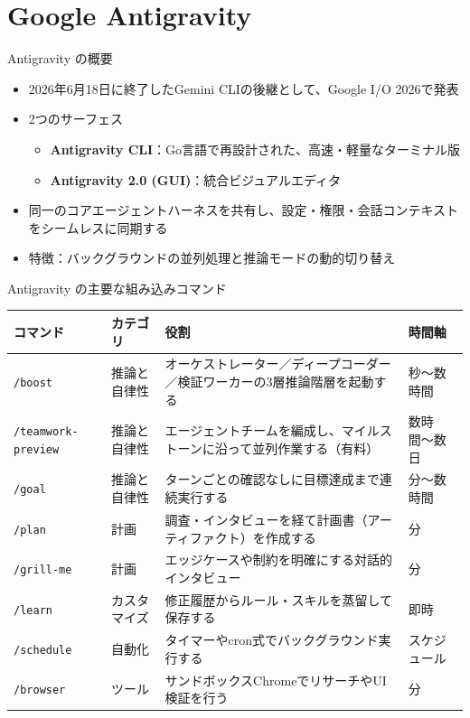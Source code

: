 \documentclass[aspectratio=169,11pt]{beamer}
\newcommand{\cmd}[1]{\texttt{#1}}
\begin{document}
\section{Google Antigravity}

\begin{frame}{Antigravity の概要}
  \begin{itemize}
    \item 2026年6月18日に終了したGemini CLIの後継として、Google I/O 2026で発表\cite{r23}
    \item 2つのサーフェス
      \begin{itemize}
        \item \textbf{Antigravity CLI}：Go言語で再設計された、高速・軽量なターミナル版
        \item \textbf{Antigravity 2.0 (GUI)}：統合ビジュアルエディタ
      \end{itemize}
    \item 同一のコアエージェントハーネスを共有し、設定・権限・会話コンテキストをシームレスに同期する\cite{r26}
    \item 特徴：バックグラウンドの並列処理と\alert{推論モードの動的切り替え}
  \end{itemize}
\end{frame}

\begin{frame}{Antigravity の主要な組み込みコマンド}
  \scriptsize
  \begin{tabularx}{\textwidth}{P{27mm}P{17mm}LP{17mm}}
    \toprule
    コマンド & カテゴリ & 役割 & 時間軸 \\
    \midrule
    \cmd{/boost} & 推論と自律性 & オーケストレーター／ディープコーダー／検証ワーカーの3層推論階層を起動する & 秒〜数時間 \\
    \cmd{/teamwork-preview} & 推論と自律性 & エージェントチームを編成し、マイルストーンに沿って並列作業する（有料） & 数時間〜数日 \\
    \cmd{/goal} & 推論と自律性 & ターンごとの確認なしに目標達成まで連続実行する & 分〜数時間 \\
    \cmd{/plan} & 計画 & 調査・インタビューを経て計画書（アーティファクト）を作成する & 分 \\
    \cmd{/grill-me} & 計画 & エッジケースや制約を明確にする対話的インタビュー & 分 \\
    \cmd{/learn} & カスタマイズ & 修正履歴からルール・スキルを蒸留して保存する & 即時 \\
    \cmd{/schedule} & 自動化 & タイマーやcron式でバックグラウンド実行する & スケジュール \\
    \cmd{/browser} & ツール & サンドボックスChromeでリサーチやUI検証を行う & 分 \\
    \bottomrule
  \end{tabularx}
  \par\hfill{\scriptsize\cite{r8}}
\end{frame}
\end{document}

